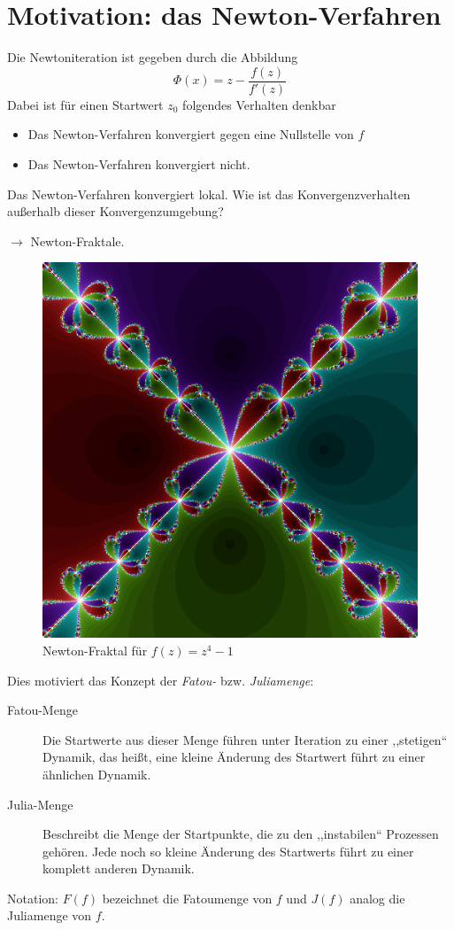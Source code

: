 \documentclass{mywork}
\begin{document}
\section{Motivation: das Newton-Verfahren}

Die Newtoniteration ist gegeben durch die Abbildung
\[
	\Phi(x)=z-\frac{f(z)}{f'(z)}
\]
Dabei ist für einen Startwert $z_0$ folgendes Verhalten denkbar
\begin{itemize}
\item Das Newton-Verfahren konvergiert gegen eine Nullstelle von $f$
\item Das Newton-Verfahren konvergiert nicht.
\end{itemize}

Das Newton-Verfahren konvergiert lokal. Wie ist das Konvergenzverhalten außerhalb dieser Konvergenzumgebung?

$\longrightarrow$ Newton-Fraktale.


\begin{figure}[H]
\centering
\includegraphics[scale=0.3]{fraktal.png}
\caption{Newton-Fraktal für $f(z)=z^4-1$}
\end{figure}


Dies motiviert das Konzept der \emph{Fatou-} bzw. \emph{Juliamenge}:
\begin{description}
\item[Fatou-Menge] Die Startwerte aus dieser Menge führen unter Iteration zu einer ,,stetigen`` Dynamik, das heißt, eine kleine Änderung des Startwert führt zu einer ähnlichen Dynamik.
\item[Julia-Menge] Beschreibt die Menge der Startpunkte, die zu den ,,instabilen`` Prozessen gehören. Jede noch so kleine Änderung des Startwerts führt zu einer komplett anderen Dynamik.
\end{description} 
Notation: $F(f)$ bezeichnet die Fatoumenge von $f$ und $J(f)$ analog die Juliamenge von $f$.
\end{document}
